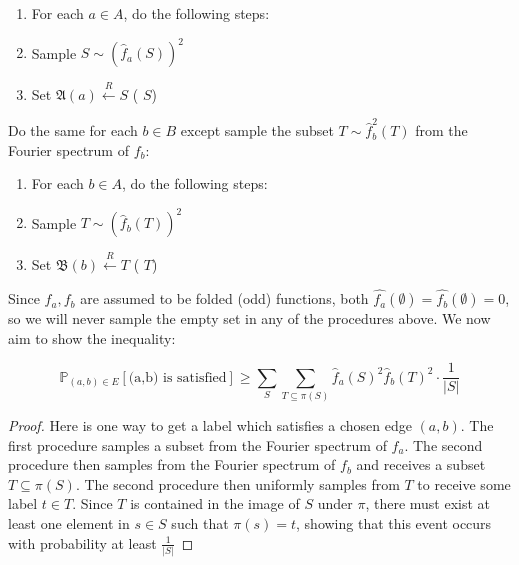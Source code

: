\begin{enumerate}
    \item For each $a \in A$, do the following steps:
    \item Sample $S \sim (\widehat{f}_a(S))^2$
    \item Set $\mathfrak{A}(a) \xleftarrow{R} S$ \quad ( $S$)
\end{enumerate}

Do the same for each $b \in B$ except sample the subset $T \sim \widehat{f}_b^2(T)$ from the Fourier spectrum of $f_b$:

\begin{enumerate}
    \item For each $b \in A$, do the following steps:
    \item Sample $T \sim (\widehat{f}_b(T))^2$
    \item Set $\mathfrak{B}(b) \xleftarrow{R} T$ \quad ( $T$)
\end{enumerate}


 Since $f_a,f_b$ are assumed to be folded (odd) functions, both $\widehat{f_a}(\emptyset) = \widehat{f_b}(\emptyset) = 0$, so we will never sample the empty set in any of the procedures above. We now aim to show the inequality:

\begin{lemma} \label{firststepsoundness}
  \begin{equation}
      \mathbb{P}_{(a,b) \in E}[ \text{(a,b) is satisfied}] \geq \sum_{S} \sum_{T \subseteq \pi(S)} \widehat{f}_a(S)^2\widehat{f}_b(T)^2 \cdot \frac{1}{|S|}
  \end{equation}
\end{lemma}
\begin{proof}
  Here is one way to get a label which satisfies a chosen edge $(a,b)$. The first procedure samples a subset from the Fourier spectrum of $f_a$. The second procedure then samples from the Fourier spectrum of $f_b$ and receives a subset $T \subseteq \pi(S)$. The second procedure then uniformly samples from $T$ to receive some label $t \in T$. Since $T$ is contained in the image of $S$ under $\pi$, there must exist at least one element in $s \in S$ such that $\pi(s) = t$, showing that this event occurs with probability at least $\frac{1}{|S|}$
\end{proof}

